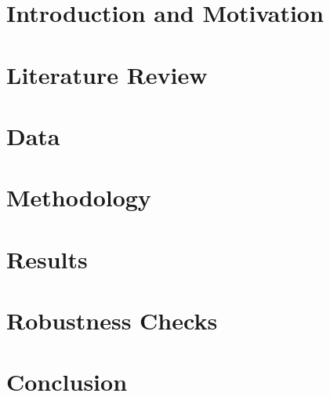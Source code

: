 \documentclass[12pt,oneside,reqno]{amsart}
\begin{document}




\section{Introduction and Motivation}



\section{Literature Review}
\label{Literature}



\section{Data}
\label{Data}


 
\section{Methodology}
\label{Methodology}


\section{Results}
\label{Results}


\section{Robustness Checks}

\label{Robustness}

\section{Conclusion}
\label{Conclusion}



\newpage
{}



%
\end{document}
